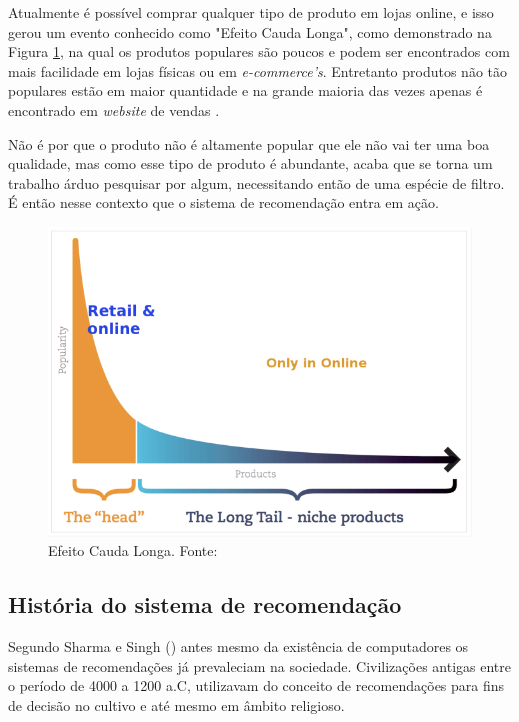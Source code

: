 Atualmente é possível comprar qualquer tipo de produto em lojas online, e isso gerou um evento conhecido como "Efeito Cauda Longa", como demonstrado na Figura \ref{fig:efeito_cauda}, na qual os produtos populares são poucos e podem ser encontrados com mais facilidade em lojas físicas ou em \textit{e-commerce’s}. Entretanto produtos não tão populares estão em maior quantidade e na grande maioria das vezes apenas é encontrado em \textit{website} de vendas \cite{pandey:2019}.

Não é por que o produto não é altamente popular que ele não vai ter uma boa qualidade, mas como esse tipo de produto é abundante, acaba que se torna um trabalho árduo pesquisar por algum, necessitando então de uma espécie de filtro. É então nesse contexto que o sistema de recomendação entra em ação.

\begin{figure}[H]
    \centering
    \includegraphics[scale=0.35]{figuras/referencial_teorico/efeito_cauda.png}
    \caption[Efeito Cauda Longa]{Efeito Cauda Longa. Fonte: \cite{pandey:2019}}
    \label{fig:efeito_cauda}
\end{figure}

\subsection{História do sistema de recomendação}

Segundo Sharma e Singh (\citeyear{Sharma:2016}) antes mesmo da existência de computadores os sistemas de recomendações já prevaleciam na sociedade. Civilizações antigas entre o período de 4000 a 1200 a.C, utilizavam do conceito de recomendações para fins de decisão no cultivo e até mesmo em âmbito religioso.

